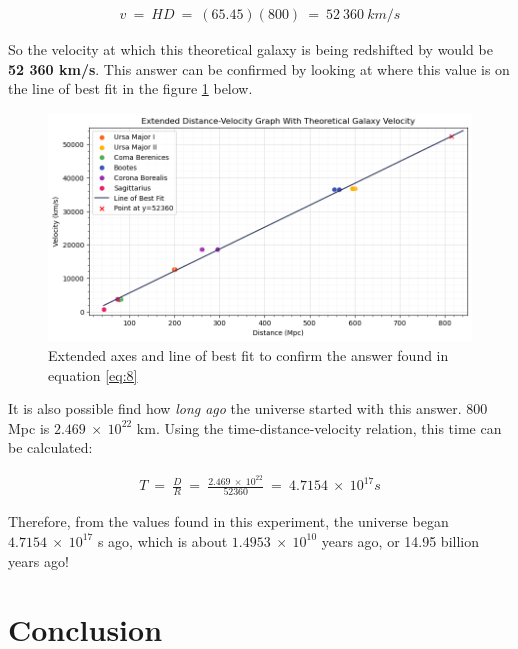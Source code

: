 \documentclass[12pt]{article}
\begin{document}
\begin{gather} \label{eq:8}
    v \: = \: HD \: = \: (65.45)(800) \: = \: 52 \: 360 \: km/s
\end{gather}

So the velocity at which this theoretical galaxy is being redshifted by would be \textbf{52 360 km/s}. This answer can be confirmed by looking at where this value is on
the line of best fit in the figure \ref{fig:extend} below.

\begin{figure}[H]
    \centering
    \includegraphics[width=\textwidth]{extended x.png}
    \caption{\centering \footnotesize{Extended axes and line of best fit to confirm the answer found in equation \protect\ref{eq:8}}}
    \label{fig:extend}
\end{figure}

It is also possible find how \textit{long ago} the universe started with this answer. 800 Mpc is $2.469 \: \times \: 10^{22}$ km. Using the time-distance-velocity relation,
this time can be calculated:

\begin{gather} \label{eq:9}
    T \: = \: \frac{D}{R} \: = \: \frac{2.469 \: \times \: 10^{22}}{52360} \: = \: 4.7154 \: \times \: 10^{17} s
\end{gather}

Therefore, from the values found in this experiment, the universe began $4.7154 \: \times \: 10^{17}$ s ago, which is about $1.4953 \: \times \: 10^{10}$ years ago, or 14.95 billion years ago!

\newpage

\section{Conclusion} \label{sec:4}
\end{document}
